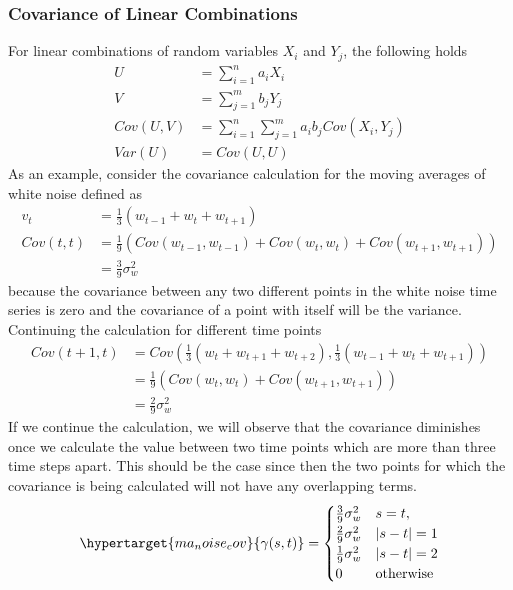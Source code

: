 \documentclass[../main.tex]{subfiles}
\begin{document}
    \subsubsection{Covariance of Linear Combinations}
    For linear combinations of random variables $X_{i}$ and $Y_{j}$, the following holds
    \begin{align*}
        U &= \sum_{i=1}^{n} a_{i} X_{i}\\
        V &= \sum_{j=1}^{m} b_{j} Y_{j}\\
        Cov(U,V) &= \sum_{i=1}^{n} \sum_{j=1}^{m} a_{i} b_{j} Cov(X_{i}, Y_{j})\\
        Var(U) &= Cov(U,U)
    \end{align*}
    As an example, consider the covariance calculation for the moving averages of white noise defined as
    \begin{align*}
        v_{t} &= \frac{1}{3}(w_{t-1} + w_{t} + w_{t+1})\\
        Cov(t, t) &= \frac{1}{9}(Cov(w_{t-1}, w_{t-1}) + Cov(w_{t}, w_{t}) + Cov(w_{t+1}, w_{t+1}))\\
        &= \frac{3}{9} \sigma_{w}^{2}
    \end{align*}
    because the covariance between any two different points in the white noise time series is zero and the covariance of a point with itself will be the variance.\newline
    Continuing the calculation for different time points
    \begin{align*}
        Cov(t+1, t) &= Cov(\frac{1}{3}(w_{t} + w_{t+1} + w_{t+2}), \frac{1}{3}(w_{t-1} + w_{t} + w_{t+1}))\\
        &= \frac{1}{9}(Cov(w_{t}, w_{t}) + Cov(w_{t+1}, w_{t+1}))\\
        &= \frac{2}{9}\sigma_{w}^{2}
    \end{align*}
    If we continue the calculation, we will observe that the covariance diminishes once we calculate the value between two time points which are more than three time steps apart. This should be the case since then the two points for which the covariance is being calculated will not have any overlapping terms.
    \begin{align*}
        \hypertarget{ma_noise_cov}{\gamma(s,t)} = \begin{cases} \frac{3}{9}\sigma_{w}^{2} &\mbox{$s = t$},\\
                                    \frac{2}{9}\sigma_{w}^{2} &\mbox{$\lvert s - t \rvert = 1$}\\
                                    \frac{1}{9}\sigma_{w}^{2} &\mbox{$\lvert s - t \rvert = 2$}\\
                                    0 &\mbox{otherwise} \end{cases}
    \end{align*}
\end{document}
